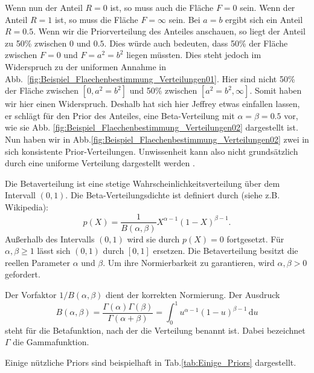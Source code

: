 Wenn nun der Anteil $R=0$ ist, so muss auch die Fläche $F=0$ sein. 
Wenn der Anteil $R=1$ ist, so muss die Fläche $F=\infty$ sein. 
Bei $a=b$ ergibt sich ein Anteil $R=0.5$. Wenn wir die Priorverteilung
des Anteiles anschauen, so liegt der Anteil zu 50\% zwischen $0$
und $0.5$. Dies würde auch bedeuten, dass 50\% der Fläche zwischen
$F=0$ und $F=a^2= b^2$ liegen müssten. Dies steht jedoch im Widerspruch
zu der uniformen Annahme in Abb.~\ref{fig:Beispiel_Flaechenbestimmung_Verteilungen01}. 
Hier sind nicht 50\% der Fläche zwischen $[0,a^2=b^2]$ und 50\%
zwischen $[a^2=b^2,\infty]$.
Somit haben wir hier einen Widerspruch.
Deshalb hat sich hier Jeffrey \cite{Hel08} etwas einfallen lassen, 
er schlägt für den Prior des Anteiles, eine Beta-Verteilung
mit $\alpha = \beta = 0.5 $ vor, wie sie Abb. \ref{fig:Beispiel_Flaechenbestimmung_Verteilungen02} dargestellt ist. Nun haben wir in Abb.\ref{fig:Beispiel_Flaechenbestimmung_Verteilungen02} 
zwei in sich konsistente Prior-Verteilungen.
Unwissenheit kann also nicht grundsätzlich durch eine uniforme Verteilung
dargestellt werden \cite{Tsc14}.

Die Betaverteilung ist eine stetige Wahrscheinlichkeitsverteilung über dem Intervall $( 0 , 1 )$.
Die Beta-Verteilungsdichte ist definiert durch (siehe z.B. Wikipedia): 
\[
p(X) = \frac{1}{B(\alpha,\beta)} X^{\alpha-1}(1-X)^{\beta-1}.
\]
Außerhalb des Intervalls $(0,1)$ wird sie durch $p(X)=0$ fortgesetzt. 
Für $\alpha,\beta \geq 1$ lässt sich $(0,1)$ durch $[0,1]$ ersetzen. Die Betaverteilung besitzt die reellen Parameter $\alpha$ und $\beta$. Um ihre Normierbarkeit zu garantieren, wird $\alpha,\beta > 0$ gefordert.

Der Vorfaktor $1/B(\alpha,\beta)$ dient der korrekten Normierung. Der Ausdruck
\[B(\alpha,\beta) = \frac{\Gamma(\alpha) \Gamma(\beta)}{\Gamma(\alpha+\beta)} = \int_0^1 u^{\alpha-1} (1-u)^{\beta-1}\, \mathrm{d}u 
\]
steht für die Betafunktion, nach der die Verteilung benannt ist. Dabei bezeichnet $\Gamma$ die Gammafunktion.

Einige nützliche Priors sind beispielhaft in Tab.\ref{tab:Einige_Priors} dargestellt.

